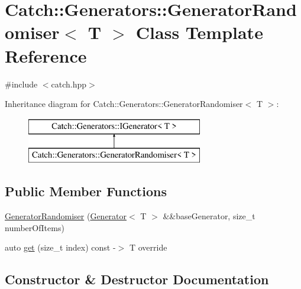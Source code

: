 \hypertarget{class_catch_1_1_generators_1_1_generator_randomiser}{}\section{Catch\+:\+:Generators\+:\+:Generator\+Randomiser$<$ T $>$ Class Template Reference}
\label{class_catch_1_1_generators_1_1_generator_randomiser}


{\ttfamily \#include $<$catch.\+hpp$>$}

Inheritance diagram for Catch\+:\+:Generators\+:\+:Generator\+Randomiser$<$ T $>$\+:\begin{figure}[H]
\begin{center}
\leavevmode
\includegraphics[height=2.000000cm]{class_catch_1_1_generators_1_1_generator_randomiser}
\end{center}
\end{figure}
\subsection*{Public Member Functions}
\begin{DoxyCompactItemize}
\item 
\mbox{\hyperlink{class_catch_1_1_generators_1_1_generator_randomiser_aba3234a2885baff107766814d10c2efc}{Generator\+Randomiser}} (\mbox{\hyperlink{class_catch_1_1_generators_1_1_generator}{Generator}}$<$ T $>$ \&\&base\+Generator, size\+\_\+t number\+Of\+Items)
\item 
auto \mbox{\hyperlink{class_catch_1_1_generators_1_1_generator_randomiser_a4ad5de15865727bdaa638863e0969ab4}{get}} (size\+\_\+t index) const -\/$>$ T override
\end{DoxyCompactItemize}


\subsection{Constructor \& Destructor Documentation}
\mbox{\label{class_catch_1_1_generators_1_1_generator_randomiser_aba3234a2885baff107766814d10c2efc}} 
